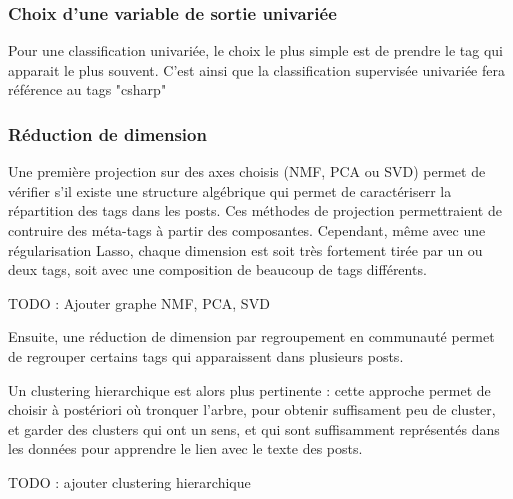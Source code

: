 \documentclass{article}
\begin{document}
\subsubsection*{Choix d'une variable de sortie univariée}
Pour une classification univariée, le choix le plus simple est de prendre le tag qui apparait le plus souvent. C'est ainsi que la classification supervisée univariée fera référence au tags "csharp"

\subsubsection*{Réduction de dimension}
Une première projection sur des axes choisis (NMF, PCA ou SVD) permet de vérifier s'il existe une structure algébrique qui permet de caractériserr la répartition des tags dans les posts. Ces méthodes de projection permettraient de contruire des méta-tags à partir des composantes. Cependant, même avec une régularisation Lasso, chaque dimension est soit très fortement tirée par un ou deux tags, soit avec une composition de beaucoup de tags différents. 

TODO : Ajouter graphe NMF, PCA, SVD

Ensuite, une réduction de dimension par regroupement en communauté permet de regrouper certains tags qui apparaissent dans plusieurs posts. 

Un clustering hierarchique est alors plus pertinente : cette approche permet de choisir à postériori où tronquer l'arbre, pour obtenir suffisament peu de cluster, et garder des clusters qui ont un sens, et qui sont suffisamment représentés dans les données pour apprendre le lien avec le texte des posts. 

TODO : ajouter clustering hierarchique 
\end{document}
